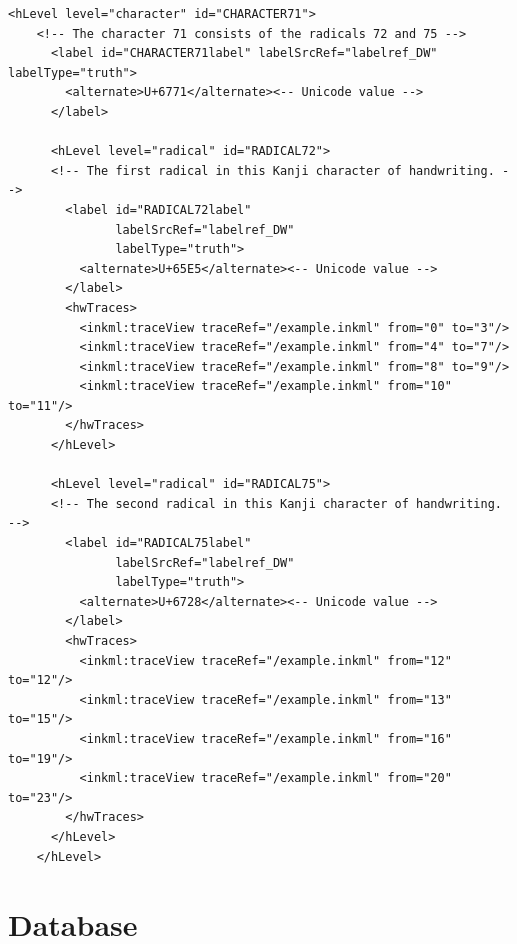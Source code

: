 \begin{xmlcode}
  \begin{lstlisting}[emph={hLevel,hwTraces,label,alternative},
                     emphstyle=\color{blue}\textbf,
                     emph={[2]id,level,labelSrcRef,labelType,traceRef,from,to},
                     emphstyle={[2]\color{red}},
                     caption={A character representation in UPX},
                     label=lst:charaterdataformat]
    <hLevel level="character" id="CHARACTER71">
    <!-- The character 71 consists of the radicals 72 and 75 -->
      <label id="CHARACTER71label" labelSrcRef="labelref_DW" labelType="truth">
        <alternate>U+6771</alternate><-- Unicode value -->
      </label>

      <hLevel level="radical" id="RADICAL72">
      <!-- The first radical in this Kanji character of handwriting. -->
        <label id="RADICAL72label" 
               labelSrcRef="labelref_DW" 
               labelType="truth">
          <alternate>U+65E5</alternate><-- Unicode value -->
        </label>
        <hwTraces>
          <inkml:traceView traceRef="/example.inkml" from="0" to="3"/>
          <inkml:traceView traceRef="/example.inkml" from="4" to="7"/>
          <inkml:traceView traceRef="/example.inkml" from="8" to="9"/>
          <inkml:traceView traceRef="/example.inkml" from="10" to="11"/>
        </hwTraces>
      </hLevel>

      <hLevel level="radical" id="RADICAL75">
      <!-- The second radical in this Kanji character of handwriting. -->
        <label id="RADICAL75label" 
               labelSrcRef="labelref_DW" 
               labelType="truth">
          <alternate>U+6728</alternate><-- Unicode value -->
        </label>
        <hwTraces>
          <inkml:traceView traceRef="/example.inkml" from="12" to="12"/>
          <inkml:traceView traceRef="/example.inkml" from="13" to="15"/>
          <inkml:traceView traceRef="/example.inkml" from="16" to="19"/>
          <inkml:traceView traceRef="/example.inkml" from="20" to="23"/>
        </hwTraces>
      </hLevel>
    </hLevel>
  \end{lstlisting}
\end{xmlcode}

\section{Database}
\label{sec:hwre:database}


